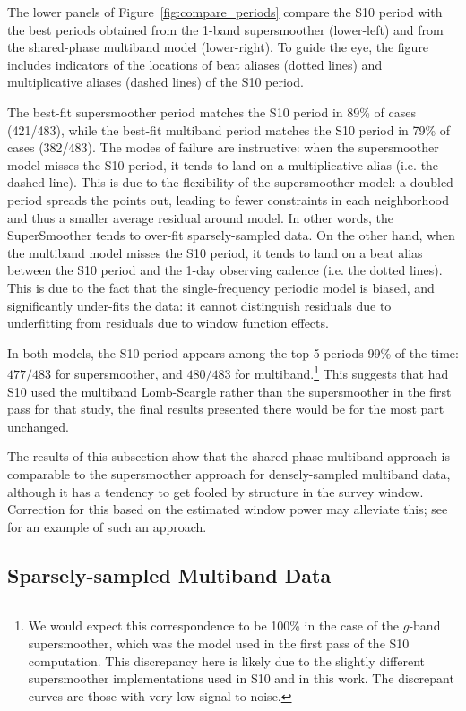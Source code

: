 \documentclass[12pt,preprint]{aastex}
\newcommand{\Fig}[1]{Figure~\ref{fig:#1}}
\newcommand{\fig}[1]{\Fig{#1}}
\begin{document}
The lower panels of \fig{compare_periods} compare the S10 period with the best periods obtained from the 1-band supersmoother (lower-left) and from the shared-phase multiband model (lower-right). To guide the eye, the figure includes indicators of the locations of beat aliases (dotted lines) and multiplicative aliases (dashed lines) of the S10 period.

The best-fit supersmoother period matches the S10 period in 89\% of cases (421/483), while the best-fit multiband period matches the S10 period in 79\% of cases (382/483). The modes of failure are instructive: when the supersmoother model misses the S10 period, it tends to land on a multiplicative alias (i.e. the dashed line). This is due to the flexibility of the supersmoother model: a doubled period spreads the points out, leading to fewer constraints in each neighborhood and thus a smaller average residual around model. In other words, the SuperSmoother tends to over-fit sparsely-sampled data. On the other hand, when the multiband model misses the S10 period, it tends to land on a beat alias between the S10 period and the 1-day observing cadence (i.e. the dotted lines). This is due to the fact that the single-frequency periodic model is biased, and significantly under-fits the data: it cannot distinguish residuals due to underfitting from residuals due to window function effects.

In both models, the S10 period appears among the top 5 periods 99\% of the time: $477/483$ for supersmoother, and $480/483$ for multiband.\footnote{We would expect this correspondence to be 100\% in the case of the $g$-band supersmoother, which was the model used in the first pass of the S10 computation. This discrepancy here is likely due to the slightly different supersmoother implementations used in S10 and in this work. The discrepant curves are those with very low signal-to-noise.} This suggests that had S10 used the multiband Lomb-Scargle rather than the supersmoother in the first pass for that study, the final results presented there would be for the most part unchanged.

The results of this subsection show that the shared-phase multiband approach is comparable to the supersmoother approach for densely-sampled multiband data, although it has a tendency to get fooled by structure in the survey window. Correction for this based on the estimated window power may alleviate this; see \citet{Roberts87} for an example of such an approach.

\subsection{Sparsely-sampled Multiband Data}
\end{document}
